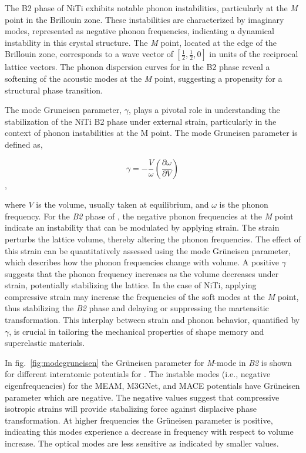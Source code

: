 \documentclass[preprint,colorlinks=true,linkcolor=black,citecolor=black]{elsarticle}
\begin{document}
The B2 phase of NiTi exhibits notable phonon instabilities,
particularly at the \textit{M} point in the Brillouin zone. These
instabilities are characterized by imaginary modes, represented as
negative phonon frequencies, indicating a dynamical instability in
this crystal structure. The \textit{M} point, located at the edge of
the Brillouin zone, corresponds to a wave vector of
$\left[\frac{1}{2}, \frac{1}{2}, 0\right]$ in units of the reciprocal
lattice vectors. The phonon dispersion curves for  in the B2
phase reveal a softening of the acoustic modes at the \textit{M}
point, suggesting a propensity for a structural phase transition. \par

The mode Gruneisen parameter, $\gamma$, plays a pivotal role in
understanding the stabilization of the NiTi B2 phase under external
strain, particularly in the context of phonon instabilities at the M
point. The mode Gruneisen parameter is defined as,

\begin{equation}
	\label{eq:modegruneisen}
	\gamma = -\frac{V}{\omega}\left(\frac{\partial \omega}{\partial V}\right)
\end{equation},

where $V$ is the volume, usually taken at equilibrium, and $\omega$ is
the phonon frequency. For the \textit{B2} phase of , the
negative phonon frequencies at the \textit{M} point indicate an
instability that can be modulated by applying strain. The strain
perturbs the lattice volume, thereby altering the phonon
frequencies. The effect of this strain can be quantitatively assessed
using the mode Gr\"{u}neisen parameter, which describes how the phonon
frequencies change with volume. A positive $\gamma$ suggests that the
phonon frequency increases as the volume decreases under strain,
potentially stabilizing the lattice. In the case of NiTi, applying
compressive strain may increase the frequencies of the soft modes at
the \textit{M} point, thus stabilizing the \textit{B2} phase and
delaying or suppressing the martensitic transformation. This interplay
between strain and phonon behavior, quantified by $\gamma$, is crucial
in tailoring the mechanical properties of shape memory and
superelastic materials.

In fig.~\ref{fig:modegruneisen} the Gr\"{u}neisen parameter for
\textit{M}-mode in \textit{B2} is shown for different interatomic
potentials for . The instable modes (i.e., negative
eigenfrequencies) for the MEAM, M3GNet, and MACE potentials have
Gr\"{u}neisen parameter which are negative. The negative values
suggest that compressive isotropic strains will provide stabalizing
force against displacive phase transformation. At higher frequencies
the Gr\"{u}neisen parameter is positive, indicating this modes
experience a decrease in frequency with respect to volume
increase. The optical modes are less sensitive as indicated by smaller
values. \par
\end{document}
